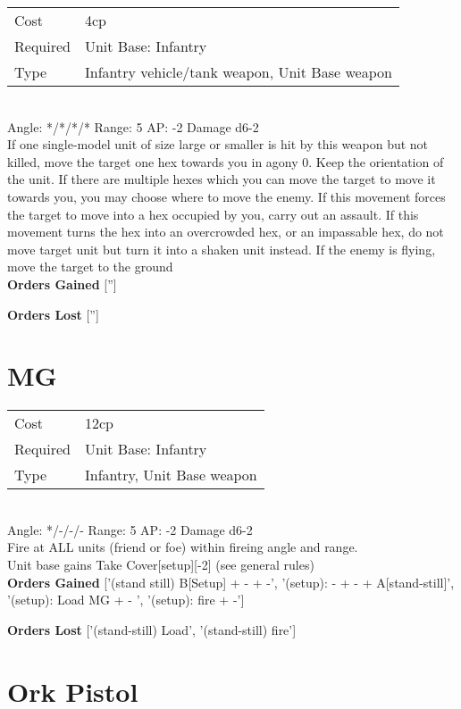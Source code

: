 \begin{tabular}{ll}
    Cost & 4cp \\
    Required & Unit Base: Infantry\\
    Type & Infantry vehicle/tank weapon, Unit Base weapon\\
\end{tabular}
\ \\
\indent Angle: */*/*/* Range: 5  AP: -2 Damage d6-2 \\
If one single-model unit of size large or smaller is hit by this weapon but not killed, move the target one hex towards you in agony 0. Keep the orientation of the unit. If there are multiple hexes which you can move the target to move it towards you, you may choose where to move the enemy. If this movement forces the target to move into a hex occupied by you, carry out an assault. If this movement turns the hex into an overcrowded hex, or an impassable hex, do not move target unit but turn it into a shaken unit instead. If the enemy is flying, move the target to the ground
\ \\

{\bf Orders Gained}
['']

{\bf Orders Lost}
['']
\section{ MG }

\begin{tabular}{ll}
    Cost & 12cp \\
    Required & Unit Base: Infantry\\
    Type & Infantry, Unit Base weapon\\
\end{tabular}
\ \\
\indent Angle: */-/-/- Range: 5  AP: -2 Damage d6-2 \\
Fire at ALL units (friend or foe) within fireing angle and range.\\ Unit base gains Take Cover[setup][-2] (see general rules)
\ \\

{\bf Orders Gained}
['(stand still) B[Setup] + - + -', '(setup): - + - + A[stand-still]', '(setup): Load MG + - ', '(setup): fire + -']

{\bf Orders Lost}
['(stand-still) Load', '(stand-still) fire']
\section{ Ork Pistol }

